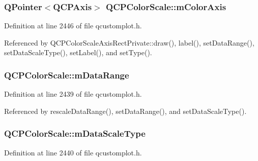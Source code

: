 \subsubsection[{m\+Color\+Axis}]{\setlength{\rightskip}{0pt plus 5cm}Q\+Pointer$<${\bf Q\+C\+P\+Axis}$>$ Q\+C\+P\+Color\+Scale\+::m\+Color\+Axis\hspace{0.3cm}{\ttfamily [protected]}}\label{class_q_c_p_color_scale_a2efbc90fd31898fe05d2b74a8422b1d5}


Definition at line 2446 of file qcustomplot.\+h.



Referenced by Q\+C\+P\+Color\+Scale\+Axis\+Rect\+Private\+::draw(), label(), set\+Data\+Range(), set\+Data\+Scale\+Type(), set\+Label(), and set\+Type().

\hypertarget{class_q_c_p_color_scale_a5d4853feb32cd0077bb2b871687c844b}{}
\subsubsection[{m\+Data\+Range}]{ Q\+C\+P\+Color\+Scale\+::m\+Data\+Range\hspace{0.3cm}{\ttfamily [protected]}}\label{class_q_c_p_color_scale_a5d4853feb32cd0077bb2b871687c844b}


Definition at line 2439 of file qcustomplot.\+h.



Referenced by rescale\+Data\+Range(), set\+Data\+Range(), and set\+Data\+Scale\+Type().

\hypertarget{class_q_c_p_color_scale_a2754d6a78736f64a241e333fbd955372}{}
\subsubsection[{m\+Data\+Scale\+Type}]{ Q\+C\+P\+Color\+Scale\+::m\+Data\+Scale\+Type\hspace{0.3cm}{\ttfamily [protected]}}\label{class_q_c_p_color_scale_a2754d6a78736f64a241e333fbd955372}


Definition at line 2440 of file qcustomplot.\+h.



